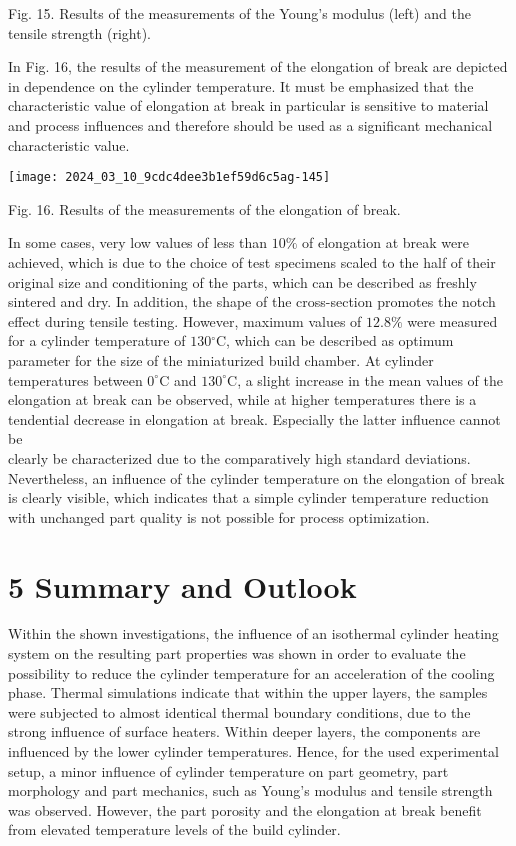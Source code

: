 \documentclass[10pt]{article}
\begin{document}
Fig. 15. Results of the measurements of the Young's modulus (left) and the tensile strength (right).

In Fig. 16, the results of the measurement of the elongation of break are depicted in dependence on the cylinder temperature. It must be emphasized that the characteristic value of elongation at break in particular is sensitive to material and process influences and therefore should be used as a significant mechanical characteristic value.

\begin{center}
\texttt{[image: 2024\_03\_10\_9cdc4dee3b1ef59d6c5ag-145]}
\end{center}

Fig. 16. Results of the measurements of the elongation of break.

In some cases, very low values of less than $10 \%$ of elongation at break were achieved, which is due to the choice of test specimens scaled to the half of their original size and conditioning of the parts, which can be described as freshly sintered and dry. In addition, the shape of the cross-section promotes the notch effect during tensile testing. However, maximum values of $12.8 \%$ were measured for a cylinder temperature of $130{ }^{\circ} \mathrm{C}$, which can be described as optimum parameter for the size of the miniaturized build chamber. At cylinder temperatures between $0^{\circ} \mathrm{C}$ and $130^{\circ} \mathrm{C}$, a slight increase in the mean values of the elongation at break can be observed, while at higher temperatures there is a tendential decrease in elongation at break. Especially the latter influence cannot be\\
clearly be characterized due to the comparatively high standard deviations. Nevertheless, an influence of the cylinder temperature on the elongation of break is clearly visible, which indicates that a simple cylinder temperature reduction with unchanged part quality is not possible for process optimization.

\section*{5 Summary and Outlook}
Within the shown investigations, the influence of an isothermal cylinder heating system on the resulting part properties was shown in order to evaluate the possibility to reduce the cylinder temperature for an acceleration of the cooling phase. Thermal simulations indicate that within the upper layers, the samples were subjected to almost identical thermal boundary conditions, due to the strong influence of surface heaters. Within deeper layers, the components are influenced by the lower cylinder temperatures. Hence, for the used experimental setup, a minor influence of cylinder temperature on part geometry, part morphology and part mechanics, such as Young's modulus and tensile strength was observed. However, the part porosity and the elongation at break benefit from elevated temperature levels of the build cylinder.
\end{document}

